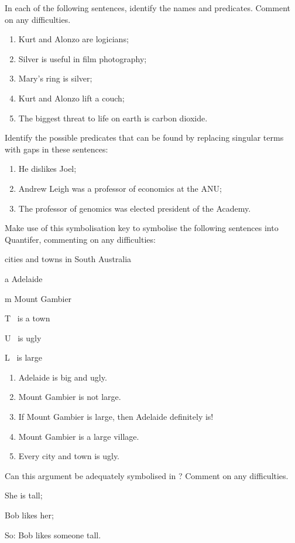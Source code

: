 \practiceproblems

\problempart In each of the following sentences, identify the names and predicates. Comment on any difficulties.\begin{enumerate}
	\item Kurt and Alonzo are logicians;
	\item Silver is useful in film photography;
	\item Mary's ring is silver;
	\item Kurt and Alonzo lift a couch;
	\item The biggest threat to life on earth is carbon dioxide.
\end{enumerate}

\problempart Identify the possible predicates that can be found by replacing singular terms with gaps in these sentences: \begin{enumerate}
	\item He dislikes Joel;
	\item Andrew Leigh was a professor of economics at the ANU;
	\item The professor of genomics was elected president of the Academy.
\end{enumerate}


\problempart
Make use of this symbolisation key to symbolise the following sentences into Quantifer, commenting on any difficulties:
\begin{ekey}
		\item[\domain] cities and towns in South Australia
		\item[a] Adelaide
		\item[m] Mount Gambier
		\item[T] \blank\ is a town
		\item[U] \blank\ is ugly
		\item[L] \blank\ is large
	\end{ekey}

\begin{enumerate}
	\item Adelaide is big and ugly.
	\item Mount Gambier is not large.
	\item If Mount Gambier is large, then Adelaide definitely is!
	\item Mount Gambier is a large village.
	\item Every city and town is ugly.
\end{enumerate}

\problempart Can this argument be adequately symbolised in \FOL? Comment on any difficulties. \begin{earg}
	\item She is tall;
	\item Bob likes her;
	\item[So:] Bob likes someone tall. 
\end{earg}

